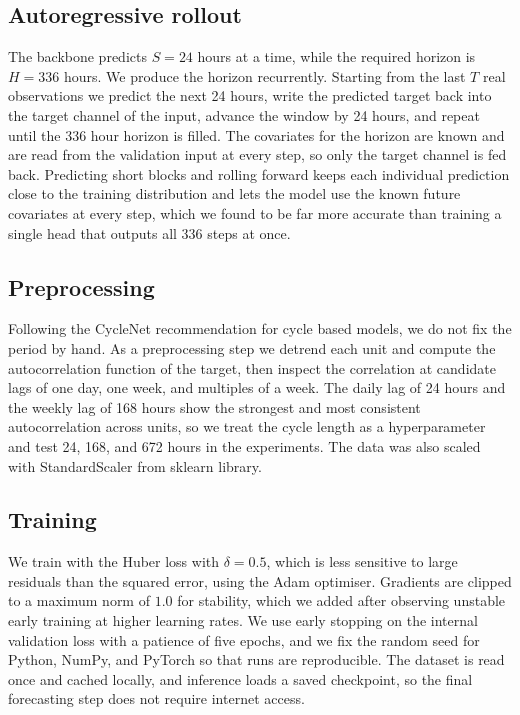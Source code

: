 \documentclass[11pt]{article}
\begin{document}
\subsection{Autoregressive rollout}
The backbone predicts $S=24$ hours at a time, while the required horizon is $H=336$ hours. We
produce the horizon recurrently. Starting from the last $T$ real observations we predict the
next 24 hours, write the predicted target back into the target channel of the input, advance
the window by 24 hours, and repeat until the 336 hour horizon is filled. The covariates for the
horizon are known and are read from the validation input at every step, so only the target
channel is fed back. Predicting short blocks and rolling forward keeps each individual
prediction close to the training distribution and lets the model use the known future covariates
at every step, which we found to be far more accurate than training a single head that outputs
all 336 steps at once.

\subsection{Preprocessing}
Following the CycleNet \cite{lin2024cyclenet} recommendation for cycle based models, we do not fix the period by hand.
As a preprocessing step we detrend each unit and compute the autocorrelation function of the
target, then inspect the correlation at candidate lags of one day, one week, and multiples of a
week. The daily lag of 24 hours and the weekly lag of 168 hours show the strongest and most
consistent autocorrelation across units, so we treat the cycle length as a hyperparameter and
test 24, 168, and 672 hours in the experiments. The data was also scaled with StandardScaler from sklearn library.

\subsection{Training}
We train with the Huber loss with $\delta=0.5$, which is less sensitive to large residuals than
the squared error, using the Adam optimiser. Gradients are clipped to a maximum norm of $1.0$
for stability, which we added after observing unstable early training at higher learning rates.
We use early stopping on the internal validation loss with a patience of five epochs, and we fix
the random seed for Python, NumPy, and PyTorch so that runs are reproducible. The dataset is
read once and cached locally, and inference loads a saved checkpoint, so the final forecasting
step does not require internet access.
\end{document}
